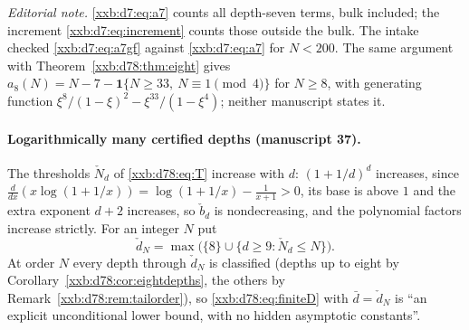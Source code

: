 \documentclass[11pt,a4paper]{article}
\numberwithin{equation}{section}
\theoremstyle{definition}
\theoremstyle{remark}
\theoremstyle{plain}
\begin{document}
\emph{Editorial note.}  \eqref{xxb:d7:eq:a7} counts all depth-seven terms,
bulk included; the increment \eqref{xxb:d7:eq:increment} counts those
outside the bulk.  The intake checked \eqref{xxb:d7:eq:a7gf} against
\eqref{xxb:d7:eq:a7} for $N<200$.  The same argument with
Theorem~\ref{xxb:d78:thm:eight} gives $a_8(N)=N-7-\mathbf 1\{N\ge33,\
N\equiv1\pmod4\}$ for $N\ge8$, with generating function
$\xi^8/(1-\xi)^2-\xi^{33}/(1-\xi^4)$; neither manuscript states it.

\paragraph{Logarithmically many certified depths (manuscript 37).}  The
thresholds $\check N_d$ of \eqref{xxb:d78:eq:T} increase with $d$: $(1+1/d)^d$
increases, since $\frac{d}{dx}(x\log(1+1/x))=\log(1+1/x)-\frac1{x+1}>0$, its
base is above $1$ and the extra exponent $d+2$ increases, so $\check b_d$ is
nondecreasing, and the polynomial factors increase strictly.  For an integer $N$
put
\begin{equation}\label{xxb:d78:eq:DN}
 \check d_N=\max\bigl(\{8\}\cup\{d\ge9:\check N_d\le N\}\bigr).
\end{equation}
At order $N$ every depth through $\check d_N$ is classified (depths up to eight
by Corollary~\ref{xxb:d78:cor:eightdepths}, the others by
Remark~\ref{xxb:d78:rem:tailorder}), so \eqref{xxb:d78:eq:finiteD} with
$\bar d=\check d_N$ is ``an explicit unconditional lower bound, with no hidden
asymptotic constants''.
\end{document}
